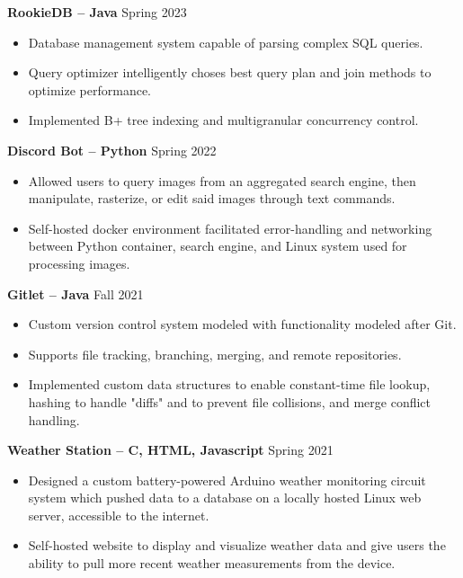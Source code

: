 \documentclass{article}
\begin{document}
    \begin{adjustwidth}{1em}{1em}
        \textbf{RookieDB -- Java} \hfill Spring 2023
        \begin{itemize}
            \item Database management system capable of parsing complex SQL queries.
            \item Query optimizer intelligently choses best query plan and join methods to optimize performance.
            \item Implemented B+ tree indexing and multigranular concurrency control. 
        \end{itemize}

        \vspace{1mm}

        \textbf{Discord Bot -- Python} \hfill Spring 2022
        \begin{itemize}
            \item Allowed users to query images from an aggregated search engine, then manipulate, rasterize, or edit said images through text commands.
            \item Self-hosted docker environment facilitated error-handling and networking between Python container, search engine, and Linux system used for processing images.
        \end{itemize}

        \textbf{Gitlet -- Java} \hfill Fall 2021 
        \begin{itemize}
            \item Custom version control system modeled with functionality modeled after Git.
            \item Supports file tracking, branching, merging, and remote repositories.
            \item Implemented custom data structures to enable constant-time file lookup, hashing to handle "diffs" and to prevent file collisions, and merge conflict handling.
        \end{itemize}

        \vspace{1mm}

        \noindent \textbf{Weather Station -- C, HTML, Javascript} \hfill Spring 2021
        \begin{itemize}
            \item Designed a custom battery-powered Arduino weather monitoring circuit system which pushed data to a database on a locally hosted Linux web server, accessible to the internet. 
            \item Self-hosted website to display and visualize weather data and give users the ability to pull more recent weather measurements from the device.
        \end{itemize}

        
    \end{adjustwidth}
\end{document}
